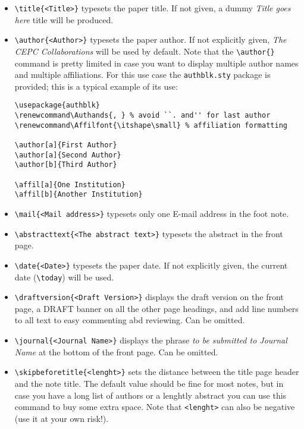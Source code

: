 \documentclass[11pt,a4paper]{cepcnote}
\begin{document}
\begin{itemize}

  \item {\verb|\title{<Title>}|} typesets the paper title. If not
    given, a dummy \emph{Title goes here} title will be produced.

  \item {\verb|\author{<Author>}|} typesets the paper author. If not
    explicitly given, \emph{The CEPC Collaborations} will be used by
    default. Note that the \verb|\author{}| command is pretty limited
    in case you want to display multiple author names and multiple
    affiliations. For this use case the \verb|authblk.sty| package is
    provided; this is a typical example of its use:
    \begin{verbatim}
\usepackage{authblk}
\renewcommand\Authands{, } % avoid ``. and'' for last author
\renewcommand\Affilfont{\itshape\small} % affiliation formatting

\author[a]{First Author}
\author[a]{Second Author}
\author[b]{Third Author}

\affil[a]{One Institution}
\affil[b]{Another Institution}
    \end{verbatim}
  \item {\verb|\mail{<Mail address>}|} typesets only one E-mail address in the foot note.

  \item {\verb|\abstracttext{<The abstract text>}|} typesets the
    abstract in the front page.

  \item {\verb|\date{<Date>}|} typesets the paper date. If not
    explicitly given, the current date (\verb|\today|) will be used.

  \item {\verb|\draftversion{<Draft Version>}|} displays the draft
    version on the front page, a DRAFT banner on all the other page
    headings, and add line numbers to all text to easy commenting abd
    reviewing. Can be omitted.

  \item {\verb|\journal{<Journal Name>}|} displays the phrase \emph{to
    be submitted to Journal Name} at the bottom of the front page. Can
    be omitted.

  \item {\verb|\skipbeforetitle{<lenght>}|} sets the distance between
    the title page header and the note title. The default value should
    be fine for most notes, but in case you have a long list of
    authors or a lenghtly abstract you can use this command to buy
    some extra space. Note that \verb|<lenght>| can also be negative
    (use it at your own risk!).

\end{itemize}
\end{document}
